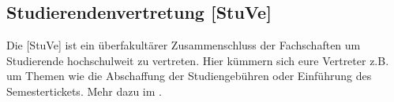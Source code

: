 \subsection{Studierendenvertretung [StuVe]}
Die [StuVe] ist ein überfakultärer Zusammenschluss der Fachschaften 
um Studierende hochschulweit zu vertreten. Hier kümmern sich 
eure Vertreter z.B. um Themen wie die Abschaffung der Studiengebühren 
oder Einführung des Semestertickets. Mehr dazu im .